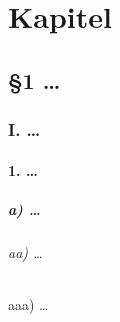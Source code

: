\part{Kapitel}
\chapter{§1 \dots}
\section{I. \dots}
\subsection{1. \dots}
\subsubsection{a) \dots}
\paragraph{aa) \dots} 
\subparagraph{aaa) \dots} 